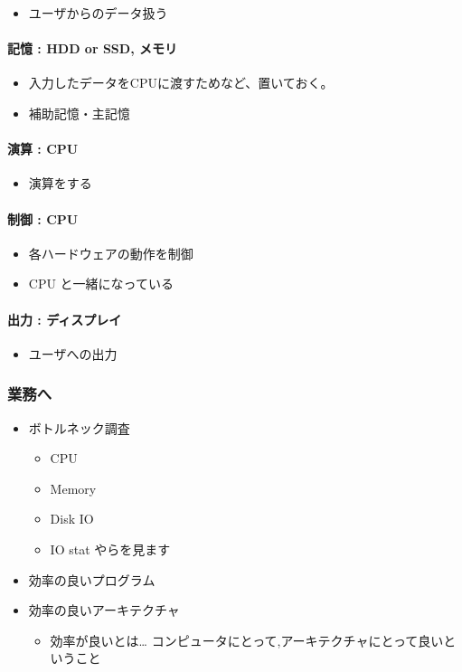 \documentclass{jsarticle}
\begin{document}
\begin{itemize}
\item
  ユーザからのデータ扱う
\end{itemize}
\paragraph{記憶 : HDD or SSD, メモリ}

\begin{itemize}
\item
  入力したデータをCPUに渡すためなど、置いておく。
\item
  補助記憶・主記憶
\end{itemize}
\paragraph{演算 : CPU}

\begin{itemize}
\item
  演算をする
\end{itemize}
\paragraph{制御 : CPU}

\begin{itemize}
\item
  各ハードウェアの動作を制御
\item
  CPU と一緒になっている
\end{itemize}
\paragraph{出力 : ディスプレイ}

\begin{itemize}
\item
  ユーザへの出力
\end{itemize}
\subsubsection{業務へ}

\begin{itemize}
\item
  ボトルネック調査
  \begin{itemize}
  \item
    CPU
  \item
    Memory
  \item
    Disk IO
  \item
    IO stat やらを見ます
  \end{itemize}
\item
  効率の良いプログラム
\item
  効率の良いアーキテクチャ
  \begin{itemize}
  \item
    効率が良いとは\ldots{}
    コンピュータにとって,アーキテクチャにとって良いということ
  \end{itemize}
\end{itemize}
\end{document}
